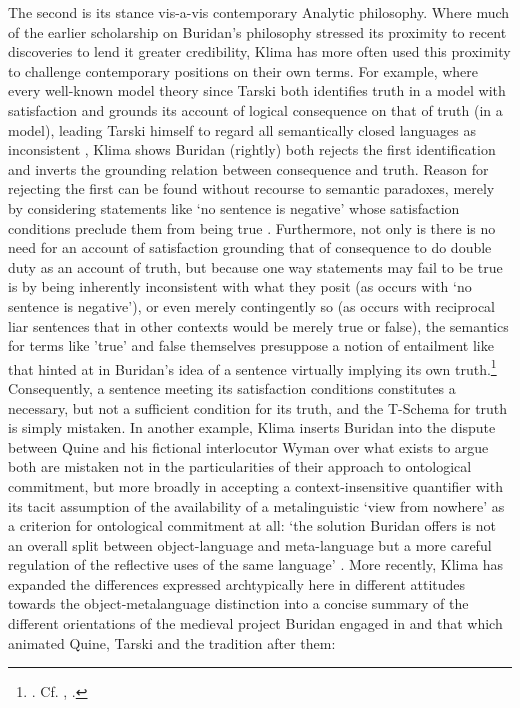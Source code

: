 \documentclass[]{article}
\begin{document}
The second is its stance vis-a-vis contemporary Analytic philosophy. 
Where much of the earlier scholarship on Buridan's philosophy 
stressed its proximity to recent discoveries 
to lend it greater credibility, 
Klima has more often used this proximity 
to challenge contemporary positions on their own terms. 
For example, 
where every well-known model theory since Tarski 
both 
identifies truth in a model with satisfaction 
and 
grounds its account of logical consequence on that of truth (in a model), 
leading Tarski himself to regard all semantically closed languages 
as inconsistent \autocite[348-349]{Tarski1943}, 
Klima shows Buridan (rightly) 
both
rejects the first identification 
and 
inverts the grounding relation between consequence and truth. 
Reason for rejecting the first can be found without recourse to semantic paradoxes, 
merely by considering statements like `no sentence is negative' 
whose satisfaction conditions preclude them from being true \autocite[96-100]{Klima2004}. 
Furthermore, 
not only is there is no need for an account of satisfaction grounding that of consequence to do double duty as an account of truth, 
but because one way statements may fail to be true 
is by being inherently inconsistent with what they posit 
(as occurs with `no sentence is negative'), 
or even merely contingently so 
(as occurs with reciprocal liar sentences that in other contexts would be merely true or false), 
the semantics for terms like 'true' and false themselves presuppose a notion of entailment like that hinted at in Buridan's idea of a sentence virtually implying its own truth.\footnote{\autocite[101-107]{Klima2004}. Cf. \autocite[221-225]{Klima2009}, \autocite[22-27]{Hughes1982}.} 
Consequently, 
a sentence meeting its satisfaction conditions constitutes a necessary, 
but not a sufficient 
condition for its truth, 
and the T-Schema for truth is simply mistaken. 
In another example, 
Klima inserts Buridan into the dispute between Quine and his fictional interlocutor Wyman over what exists 
to argue 
both are mistaken 
not in the particularities of their approach to ontological commitment, 
but more broadly 
in accepting a context-insensitive quantifier 
with its tacit assumption of the availability of a metalinguistic `view from nowhere' 
as a criterion for ontological commitment at all:  `the solution Buridan
offers is not an overall split between object-language and meta-language
but a more careful regulation of the reﬂective uses of the same language' \autocite[174]{Klima2009}. 
More recently, 
Klima has expanded the differences expressed archtypically 
here 
in different attitudes towards the object-metalanguage distinction 
into a concise summary of the different orientations 
of the medieval project Buridan engaged in 
and that which animated Quine, Tarski 
and the tradition after them:
\end{document}

